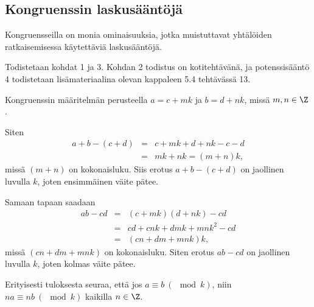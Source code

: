 \subsection*{Kongruenssin laskusääntöjä} Kongruensseilla on monia ominaisuuksia, jotka muistuttavat yhtälöiden ratkaisemisessa käytettäviä laskusääntöjä.


\begin{todistus}
Todistetaan kohdat 1 ja 3. Kohdan 2 todistus on kotitehtävänä, ja potenssisääntö 4 todistetaan lisämateriaalina olevan kappaleen 5.4 tehtävässä 13.

Kongruenssin määritelmän perusteella $a=c + mk$ ja $b= d + nk$, missä $m,n\in \Z$.

Siten
\begin{eqnarray*}
a+b - (c+d) &=& c + mk + d + nk - c - d\\ &=& mk + nk = (m+n)k,
\end{eqnarray*}
missä $(m+n)$ on kokonaisluku. Siis erotus $a + b - (c+d)$ on jaollinen luvulla $k$, joten ensimmäinen väite pätee.

Samaan tapaan saadaan
\begin{eqnarray*}
ab - cd &=& (c + mk)(d + nk) - cd\\ &=& cd +c nk + d mk + mnk^2 - cd\\ &=& (cn+dm+mnk)k,
\end{eqnarray*}
missä $(cn+dm+mnk)$ on kokonaisluku. Siten erotus $ab - cd$ on jaollinen luvulla $k$, joten kolmas väite pätee.
\end{todistus}


Erityisesti tuloksesta seuraa, että  jos $a\equiv b \ (\mod k)$, niin $na\equiv nb
\ (\mod k)$ kaikilla $n\in \Z$.


